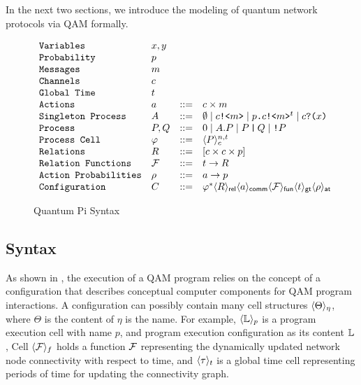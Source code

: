 In the next two sections, we introduce the modeling of quantum network protocols via QAM formally.

\begin{figure}[t]
{\small
  \[\begin{array}{llcl} 
      \texttt{Variables} & x,y \\
      \texttt{Probability} & p\\
      \texttt{Messages} & m\\
    \texttt{Channels} & c\\
    \texttt{Global Time} & t\\
    \texttt{Actions} & a & ::= & c \times m\\
      \texttt{Singleton Process} & A & ::= & \emptyset  \mid c\texttt{!<}m\texttt{>} \mid p\texttt{.}c\texttt{!<}m\texttt{>}^t \mid c\texttt{?(}x\texttt{)} \\
      \texttt{Process} & P,Q & ::= & 0 \mid A.P \mid P\,\texttt{|}\,Q \mid \texttt{!}P \\
      \texttt{Process Cell} & \varphi & ::= & \langle P \rangle^{n,t}_{c} \\
      \texttt{Relations} & R & ::= & [c \times c \times p] \\
      \texttt{Relation Functions} & \mathcal{F} & ::= & t \to R\\
    \texttt{Action Probabilities} & \rho & ::=& a \to p\\
      \texttt{Configuration} & C & ::= & \varphi^* \langle R \rangle_{\textsf{rel}}\langle a \rangle_{\textsf{comm}}\langle \mathcal{F} \rangle_{\textsf{fun}}\langle t \rangle_{\textsf{gt}}\langle \rho \rangle_{\textsf{at}}
    \end{array}
  \]
}
\caption{Quantum Pi Syntax}
  \label{fig:q-pi-syntax}
\end{figure}


\subsection{Syntax} \label{sec:qamsyntax}

As shown in , the execution of a QAM program relies on the concept of 
a configuration that describes conceptual computer components for QAM program interactions.
A configuration can possibly contain many cell structures $\langle \Theta \rangle_{\eta}$, where $\Theta$ is the content of $\eta$ is the name.
For example, $\langle \mathbb{L} \rangle_{p}$ is a program execution cell with name $p$, and program execution configuration as its content $\mathbb{L}$,
Cell $\langle \mathcal{F} \rangle_{f}$ holds a function $\mathcal{F}$ representing the dynamically updated network node connectivity with respect to time, and $\langle \tau \rangle_{t}$ is a global time cell representing periods of time for updating the connectivity graph.

